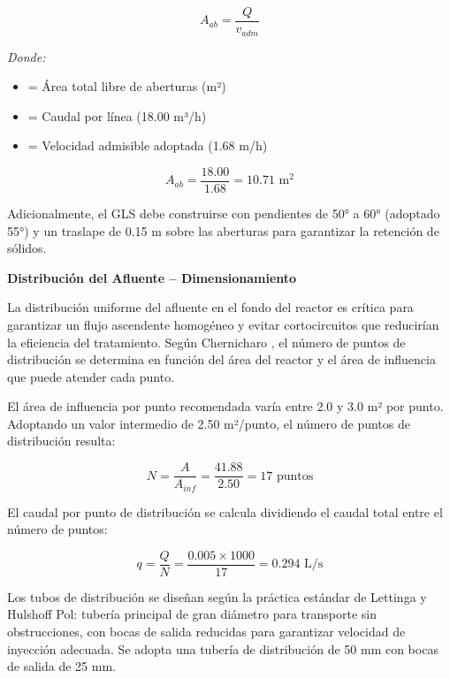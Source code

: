 \begin{equation}
A_{ab} = \frac{Q}{v_{adm}}
\end{equation}

\textit{Donde:}
\begin{itemize}[noitemsep,leftmargin=2em]
    \item[$A_{ab}$] = Área total libre de aberturas (m²)
    \item[$Q$] = Caudal por línea (18.00 m³/h)
    \item[$v_{adm}$] = Velocidad admisible adoptada (1.68 m/h)
\end{itemize}

\begin{equation}
A_{ab} = \frac{18.00}{1.68} = 10.71 \text{ m}^2
\end{equation}

Adicionalmente, el GLS debe construirse con pendientes de 50° a 60° (adoptado 55°) y un traslape de 0.15 m sobre las aberturas para garantizar la retención de sólidos.

\textbf{Distribución del Afluente -- Dimensionamiento}

La distribución uniforme del afluente en el fondo del reactor es crítica para garantizar un flujo ascendente homogéneo y evitar cortocircuitos que reducirían la eficiencia del tratamiento. Según Chernicharo \cite{chernicharo2007}, el número de puntos de distribución se determina en función del área del reactor y el área de influencia que puede atender cada punto.

El área de influencia por punto recomendada varía entre 2.0 y 3.0 m² por punto. Adoptando un valor intermedio de 2.50 m²/punto, el número de puntos de distribución resulta:

\begin{equation}
N = \frac{A}{A_{inf}} = \frac{41.88}{2.50} = 17 \text{ puntos}
\end{equation}

El caudal por punto de distribución se calcula dividiendo el caudal total entre el número de puntos:

\begin{equation}
q = \frac{Q}{N} = \frac{0.005 \times 1000}{17} = 0.294 \text{ L/s}
\end{equation}

Los tubos de distribución se diseñan según la práctica estándar de Lettinga y Hulshoff Pol: tubería principal de gran diámetro para transporte sin obstrucciones, con bocas de salida reducidas para garantizar velocidad de inyección adecuada. Se adopta una tubería de distribución de 50 mm con bocas de salida de 25 mm.

